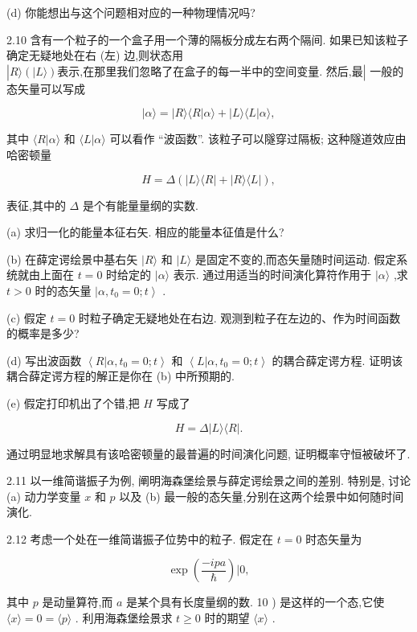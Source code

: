(d) 你能想出与这个问题相对应的一种物理情况吗?

2.10 含有一个粒子的一个盒子用一个薄的隔板分成左右两个隔间. 如果已知该粒子确定无疑地处在右 (左) 边,则状态用 $\left| {R\rangle \left( {|L\rangle }\right) \text{表示,在那里我们忽略了在盒子的每一半中的空间变量. 然后,最}}\right|$ 一般的态矢量可以写成

$$
\left| {\alpha \rangle = }\right| R\rangle \langle R | \alpha \rangle + | L\rangle \langle L | \alpha \rangle ,
$$

其中 $\langle R | \alpha \rangle$ 和 $\langle L | \alpha \rangle$ 可以看作 “波函数”. 该粒子可以隧穿过隔板; 这种隧道效应由哈密顿量

$$
H = \Delta \left( {\left| {L\rangle \langle R}\right| + \left| {R\rangle \langle L}\right| }\right) ,
$$

表征,其中的 $\Delta$ 是个有能量量纲的实数.

(a) 求归一化的能量本征右矢. 相应的能量本征值是什么?

(b) 在薛定谔绘景中基右矢 $|R\rangle$ 和 $|L\rangle$ 是固定不变的,而态矢量随时间运动. 假定系统就由上面在 $t = 0$ 时给定的 $|\alpha \rangle$ 表示. 通过用适当的时间演化算符作用于 $|\alpha \rangle$ ,求 $t > 0$ 时的态矢量 $\left| {\alpha ,{t}_{0} = 0;t}\right\rangle$ .

(c) 假定 $t = 0$ 时粒子确定无疑地处在右边. 观测到粒子在左边的、作为时间函数的概率是多少?

(d) 写出波函数 $\left\langle {R | \alpha ,{t}_{0} = 0;t}\right\rangle$ 和 $\left\langle {L | \alpha ,{t}_{0} = 0;t}\right\rangle$ 的耦合薛定谔方程. 证明该耦合薛定谔方程的解正是你在 (b) 中所预期的.

(e) 假定打印机出了个错,把 $H$ 写成了

$$
H = \Delta \left| {L\rangle \langle R}\right| .
$$

通过明显地求解具有该哈密顿量的最普遍的时间演化问题, 证明概率守恒被破坏了.

2.11 以一维简谐振子为例, 阐明海森堡绘景与薛定谔绘景之间的差别. 特别是, 讨论 (a) 动力学变量 $x$ 和 $p$ 以及 (b) 最一般的态矢量,分别在这两个绘景中如何随时间演化.

2.12 考虑一个处在一维简谐振子位势中的粒子. 假定在 $t = 0$ 时态矢量为

$$
\exp \left( \frac{-{ipa}}{\hbar }\right) | 0,
$$

其中 $p$ 是动量算符,而 $a$ 是某个具有长度量纲的数. 10 ) 是这样的一个态,它使 $\langle x\rangle = 0 = \langle p\rangle$ . 利用海森堡绘景求 $t \geq 0$ 时的期望 $\langle x\rangle$ .

